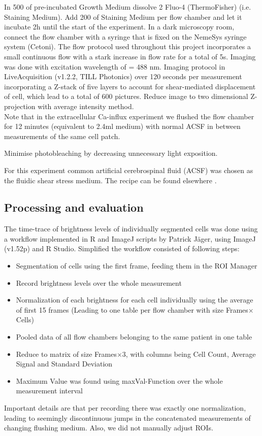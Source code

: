 In 500\mul{} of pre-incubated Growth Medium dissolve 2\mul{} Fluo-4 (ThermoFisher) (i.e. Staining Medium). Add 200\mul{} of Staining Medium per flow chamber and let it incubate 2h until the start of the experiment. 
 In a dark microscopy room, connect the flow chamber with a syringe that is fixed on the NemeSys syringe system (Cetoni). The flow protocol used throughout this project incorporates a small continuous flow with a stark increase in flow rate for a total of 5s. Imaging was done with excitation wavelength of \textlambda{} = 488 nm. Imaging protocol in LiveAcquisition (v1.2.2, TILL Photonics) over 120 seconds per measurement incorporating a Z-stack of five layers to account for shear-mediated displacement of cell, which lead to a total of 600 pictures. Reduce image to two dimensional Z-projection with average intensity method.  \\
Note that in the extracellular Ca-influx experiment we flushed the flow chamber for 12 minutes (equivalent to 2.4ml medium) with normal ACSF in between measurements of the same cell patch.

Minimise photobleaching by decreasing unnecessary light exposition.

For this experiment common artificial cerebrospinal fluid (ACSF) was chosen as the fluidic shear stress medium. The recipe can be found elsewhere . 

\subsection{Processing and evaluation}

The time-trace of brightness levels of individually segmented cells was done using a workflow implemented in R and ImageJ scripts by Patrick Jäger, using ImageJ (v1.52p) and R Studio. Simplified the workflow consisted of following steps:

\begin{itemize}
	\item Segmentation of cells using the first frame, feeding them in the ROI Manager
	\item Record brightness levels over the whole measurement
	\item Normalization of each brightness for each cell individually using the average of first 15 frames (Leading to one table per flow chamber with size Frames$\times$Cells)
	\item Pooled data of all flow chambers belonging to the same patient in one table
	\item Reduce to matrix of size Frames$\times$3, with columns being Cell Count, Average Signal and Standard Deviation
	\item Maximum Value was found using maxVal-Function over the whole measurement interval
\end{itemize}

Important details are that per recording there was exactly one normalization, leading to seemingly discontinuous jumps in the concatenated measurements of changing flushing medium. Also, we did not manually adjust ROIs. 



